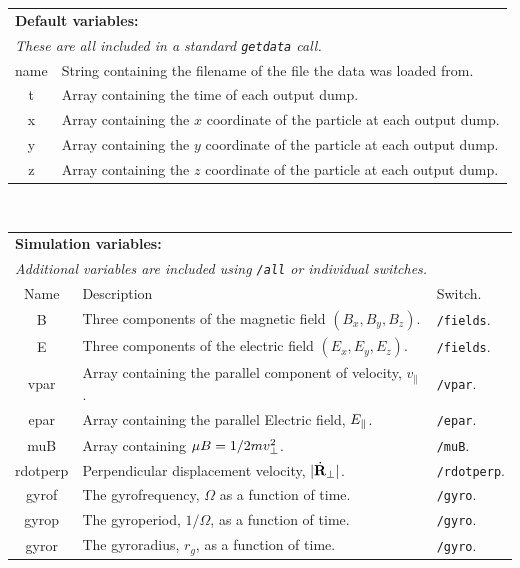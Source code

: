 \documentclass[a4paper,11pt,usenames,dvipsnames]{article}
\begin{document}
\begin{table}[ht]
\begin{flushleft}
\begin{tabular}{|c|p{}|}
\multicolumn{2}{l}{{\bf Default variables:}}\\
\multicolumn{2}{l}{{\em These are all included in a standard \texttt{getdata} call.}}\\
\hline
name& String containing the filename of the file the data was loaded from.\\
t& Array containing the time of each output dump.\\
x& Array containing the $x$ coordinate of the particle at each output dump.\\
y& Array containing the $y$ coordinate of the particle at each output dump.\\
z& Array containing the $z$ coordinate of the particle at each output dump.\\
\hline
\end{tabular}
\vspace{0.5cm}\\
\begin{tabular}{|c|p{}|l|}
\multicolumn{3}{l}{{\bf Simulation variables:}}\\
\multicolumn{3}{l}{{\em Additional variables are included using \texttt{/all} or individual switches.}}\\
\hline
Name&Description&Switch.\\
\hline
B&Three components of the magnetic field $(B_x,B_y,B_z)$.& \texttt{/fields}.\\
E&Three components of the electric field $(E_x,E_y,E_z)$.& \texttt{/fields}.\\
vpar&Array containing the parallel component of velocity, $v_\parallel$.& \texttt{/vpar}.\\
epar&Array containing the parallel Electric field, $E_{\parallel}$.& \texttt{/epar}.\\
muB&Array containing $\mu B=1/2mv_{\perp}^2$. &\texttt{/muB}.\\
rdotperp& Perpendicular displacement velocity, $|\dot{\bf{R}}_\perp|$. & \texttt{/rdotperp}.\\
gyrof& The gyrofrequency, $\Omega$ as a function of time. & \texttt{/gyro}.\\
gyrop& The gyroperiod, $1/\Omega$, as a function of time. & \texttt{/gyro}.\\
gyror& The gyroradius, $r_g$, as a function of time. & \texttt{/gyro}.\\

\end{tabular}
\end{flushleft}
\end{table}
\end{document}
